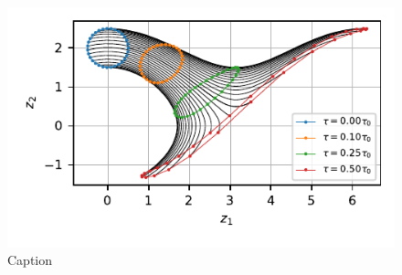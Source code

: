 \subsection{}

\begin{figure}[h!]
    \centering
    \includegraphics{CodeAndFigures/PendulumPhaseSpaceUs2f.pdf}
    \caption{Caption}
    \label{fig:pend2f}
\end{figure}

\subsection{}

